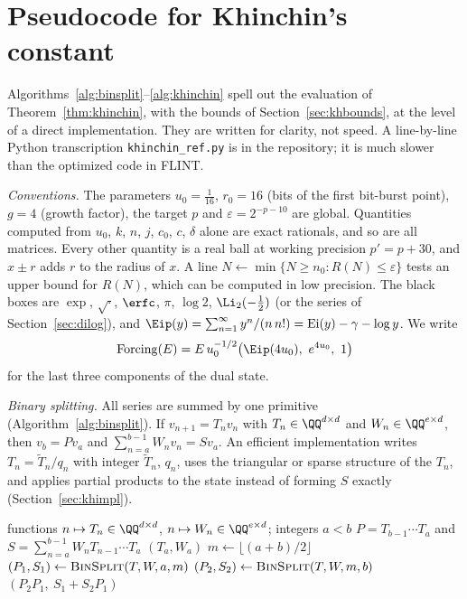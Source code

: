 
\section{Pseudocode for Khinchin's constant}\label{sec:khpseudo}

Algorithms~\ref{alg:binsplit}--\ref{alg:khinchin} spell out the evaluation of Theorem~\ref{thm:khinchin}, with the
bounds of Section~\ref{sec:khbounds}, at the level of a direct implementation.
They are written for clarity, not speed. A line-by-line Python transcription
\texttt{khinchin\_ref.py} is in the repository; it is much
slower than the optimized code in FLINT.

\emph{Conventions.} The parameters $u_0 = \frac1{16}$, $r_0 = 16$ (bits of the first bit-burst point), $g = 4$ (growth
factor), the target $p$ and $\varepsilon = 2^{-p-10}$ are global. Quantities computed from $u_0$, $k$, $n$, $j$, $c_0$,
$c$, $\delta$ alone are exact rationals, and so are all matrices. Every other quantity is a real ball at working
precision $p' = p + 30$, and $x \pm r$ adds $r$ to the radius of $x$. A line $N \gets \min\{N \ge n_0 : R(N) \le
\varepsilon\}$ tests an upper bound for $R(N)$, which can be computed in low precision. The black boxes are
$\exp$, $\sqrt{\cdot}$, $\erfc$, $\pi$, $\log 2$, $\Li_2(-\frac12)$ (or the series of Section~\ref{sec:dilog}), and
$\Eip(y) = \sum_{n=1}^{\infty}y^n/(n\,n!) = \operatorname{Ei}(y) - \gamma - \log y$. We write
\[
  \operatorname{Forcing}(E) = E\,u_0^{-1/2}\bigl(\Eip(4u_0),\ e^{4u_0},\ 1\bigr)
\]
for the last three components of the dual state.

\emph{Binary splitting.} All series are summed by one primitive (Algorithm~\ref{alg:binsplit}). If $v_{n+1} = T_nv_n$
with $T_n \in \QQ^{d\times d}$ and $W_n \in \QQ^{e\times d}$, then $v_b = Pv_a$ and $\sum_{n=a}^{b-1}W_nv_n = Sv_a$.
An efficient implementation writes $T_n = \tilde T_n/q_n$ with integer $\tilde T_n$, $q_n$, uses the triangular or
sparse structure of the $T_n$, and applies partial products to the state instead of forming $S$ exactly (Section~\ref{sec:khimpl}).

\begin{algorithm}[ht]
\caption{$\textsc{BinSplit}(T, W, a, b)$}\label{alg:binsplit}
\begin{algorithmic}[1]
\small
\Require functions $n \mapsto T_n \in \QQ^{d\times d}$, $n \mapsto W_n \in \QQ^{e\times d}$; integers $a < b$
\Ensure $P = T_{b-1}\cdots T_a$ and $S = \sum_{n=a}^{b-1}W_nT_{n-1}\cdots T_a$
 \Return $(T_a, W_a)$ \EndIf
\State $m \gets \lfloor (a+b)/2\rfloor$
\State $(P_1, S_1) \gets \textsc{BinSplit}(T, W, a, m)$
\State $(P_2, S_2) \gets \textsc{BinSplit}(T, W, m, b)$
\State \Return $(P_2P_1,\ S_1 + S_2P_1)$
\end{algorithmic}
\end{algorithm}

